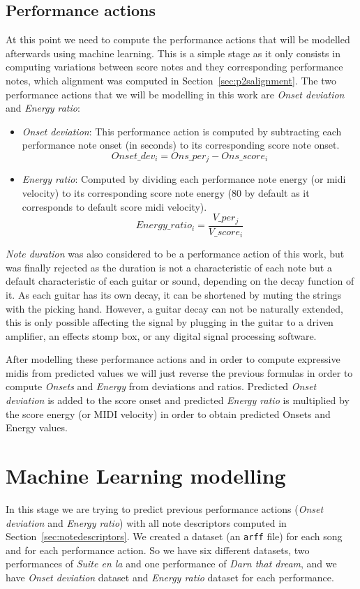 \subsection{Performance actions}
At this point we need to compute the performance actions that will be modelled afterwards using machine learning. This is a simple stage as it only consists in computing variations between score notes and they corresponding performance notes, which alignment was computed in Section~\ref{sec:p2salignment}. The two performance actions that we will be modelling in this work are \textit{Onset deviation} and \textit{Energy ratio}:

\begin{itemize}[noitemsep]
\item \textit{Onset deviation}: This performance action is computed by subtracting each performance note onset (in seconds) to its corresponding score note onset. $$Onset\_dev_i = Ons\_per_j - Ons\_score_i$$
\item \textit{Energy ratio}: Computed by dividing each performance note energy (or midi velocity) to its corresponding score note energy (80 by default as it corresponds to default score midi velocity).
$$Energy\_ratio_i = \frac{V\_per_j}{V\_score_i}$$
\end{itemize}

\textit{Note duration} was also considered to be a performance action of this work, but was finally rejected as the duration is not a characteristic of each note but a default characteristic of each guitar or sound, depending on the decay function of it. As each guitar has its own decay, it can be shortened by muting the strings with the picking hand. However, a guitar decay can not be naturally extended, this is only possible affecting the signal by plugging in the guitar to a driven amplifier, an effects stomp box, or any digital signal processing software.

After modelling these performance actions and in order to compute expressive midis from predicted values we will just reverse the previous formulas in order to compute \textit{Onsets} and \textit{Energy} from deviations and ratios. Predicted \textit{Onset deviation} is added to the score onset and predicted \textit{Energy ratio} is multiplied by the score energy (or MIDI velocity) in order to obtain predicted Onsets and Energy values.

\section{Machine Learning modelling}
In this stage we are trying to predict previous performance actions (\textit{Onset deviation} and \textit{Energy ratio}) with all note descriptors computed in Section~\ref{sec:notedescriptors}.  We created a dataset (an \texttt{arff} file) for each song and for each performance action. So we have six different datasets, two performances of \textit{Suite en la} and one performance of \textit{Darn that dream}, and we have \textit{Onset deviation} dataset and \textit{Energy ratio} dataset for each performance.

